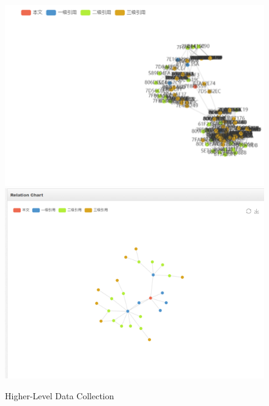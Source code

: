 \documentclass{book}
\begin{document}
\begin{figure}[H]
\centering
\includegraphics[scale=0.55]{img/zlt_rel_demo4.png}
\includegraphics[scale=0.55]{img/zlt_rel_demo5.png}
\caption{Higher-Level Data Collection}
\label{fig:rel_contrast}
\end{figure}
\end{document}
